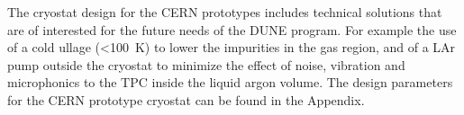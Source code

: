
%
The cryostat design for the CERN prototypes includes technical solutions that are of interested for the future needs of the DUNE program. For example the use of a cold ullage (\textless  100~K) to lower the impurities in the gas region, and of a LAr pump outside the cryostat to minimize the effect of noise, vibration and microphonics to the TPC inside the liquid argon volume.
%
The design parameters for the CERN prototype cryostat can be found in the Appendix.

